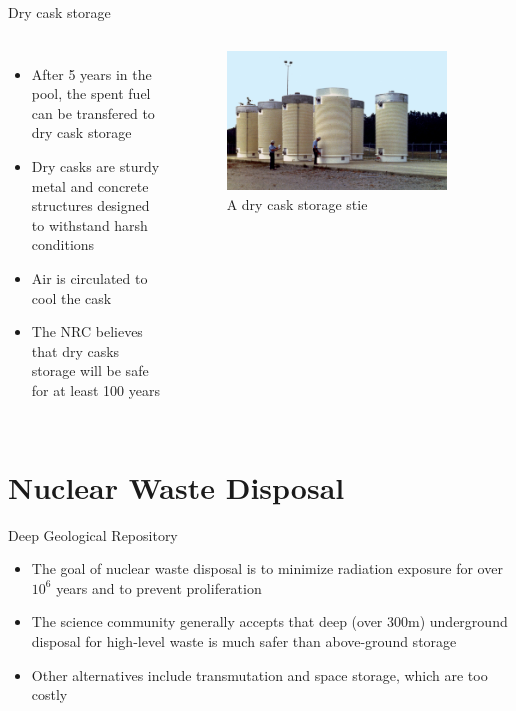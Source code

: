 \documentclass[10pt]{beamer}
\begin{document}
\begin{frame}{Dry cask storage}

  \begin{columns}[T,onlytextwidth]
      \begin{itemize}[<+->]
      	\item After 5 years in the pool, the spent fuel can be transfered to dry cask storage
        \item Dry casks are sturdy metal and concrete structures designed to withstand harsh conditions
        \item Air is circulated to cool the cask
        \item The NRC believes that dry casks storage will be safe for at least 100 years
      \end{itemize}

		\begin{figure}
		\includegraphics[width=0.9\textwidth]{dry_storage.jpg}
		\caption*{A dry cask storage stie}
		\end{figure}
  \end{columns}
\end{frame}
\section{Nuclear Waste Disposal}
	\begin{frame}{Deep Geological Repository}
    \begin{itemize}[<+->]
    \item The goal of nuclear waste disposal is to minimize radiation exposure for over $10^6$ years and to prevent proliferation
    \item The science community generally accepts that deep (over $300$m) underground disposal for high-level waste is much safer than above-ground storage
    \item Other alternatives include transmutation and space storage, which are too costly
    \end{itemize}
    \end{frame}
    
\end{document}
